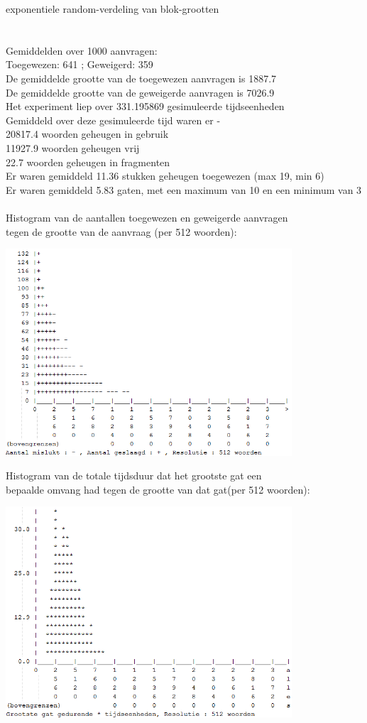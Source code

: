\documentclass[a4paper]{article}
\begin{document}
exponentiele random-verdeling van blok-grootten\\
\\
\\
Gemiddelden over 1000 aanvragen:\\
Toegewezen: 641 ; Geweigerd: 359\\
De gemiddelde grootte van de toegewezen aanvragen is 1887.7\\
De gemiddelde grootte van de geweigerde aanvragen is 7026.9\\
Het experiment liep over 331.195869 gesimuleerde tijdseenheden\\
Gemiddeld over deze gesimuleerde tijd waren er - \\
 20817.4 woorden geheugen in gebruik\\
 11927.9 woorden geheugen vrij\\
    22.7 woorden geheugen in fragmenten\\
Er waren gemiddeld    11.36 stukken geheugen toegewezen (max 19, min 6)\\
Er waren gemiddeld     5.83 gaten, met een maximum van 10 en een minimum van 3\\
\\
Histogram van de aantallen toegewezen en geweigerde aanvragen\\
tegen de grootte van de aanvraag (per 512 woorden):
\begin{center}
\includegraphics[width=0.8\textwidth]{wf3.png}
\end{center}
Histogram van de totale tijdsduur dat het grootste gat een\\
bepaalde omvang had tegen de grootte van dat gat(per 512 woorden):
\begin{center}
\includegraphics[width=0.8\textwidth]{wf4.png}
\end{center}
\end{document}
